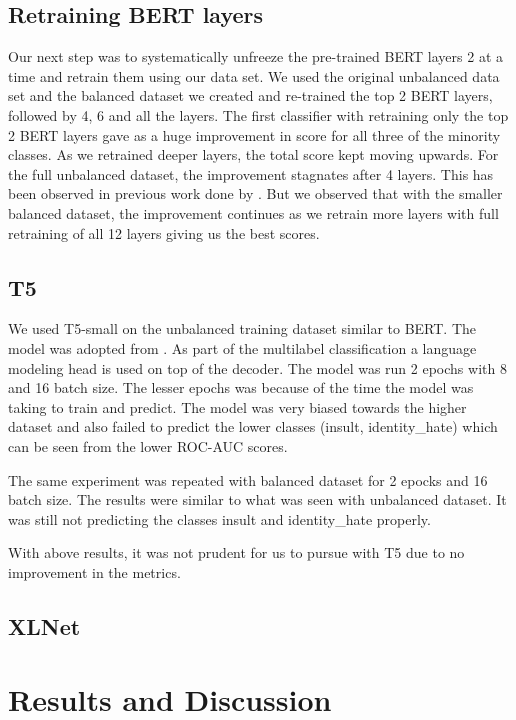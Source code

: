 \documentclass[11pt,a4paper]{article}
\begin{document}
\subsection{Retraining BERT layers}
Our next step was to systematically unfreeze the pre-trained BERT layers 2 at a time and retrain them using our data set. We used the original unbalanced data set and the balanced dataset we created and re-trained the top 2 BERT layers, followed by 4, 6 and all the layers.
The first classifier with retraining only the top 2 BERT layers gave as a huge improvement in score for all three of the minority classes. As we retrained deeper layers, the total score kept moving upwards. For the full unbalanced dataset, the improvement stagnates after 4 layers. This has been observed in previous work done by \cite{Singh2020HowMD}. But we observed that with the smaller balanced dataset, the improvement continues as we retrain more layers with full retraining of all 12 layers giving us the best scores.


\subsection{T5}
We used T5-small \cite{raffel2020exploring} on the unbalanced training dataset similar to BERT. The model was adopted from \cite{t5mlcode}. As part of the multilabel classification a language modeling head is used on top of the decoder. The model was run 2 epochs with 8 and 16 batch size. The lesser epochs was because of the time the model was taking to train and predict. The model was very biased towards the higher dataset and also failed to predict the lower classes (insult, identity\_hate) which can be seen from the lower ROC-AUC scores.

The same experiment was repeated with balanced dataset for 2 epocks and 16 batch size. The results were similar to what was seen with unbalanced dataset. It was still not predicting the classes insult and identity\_hate properly.

With above results, it was not prudent for us to pursue with T5 due to no improvement in the metrics.

\subsection{XLNet}

\section{Results and Discussion}
\end{document}
